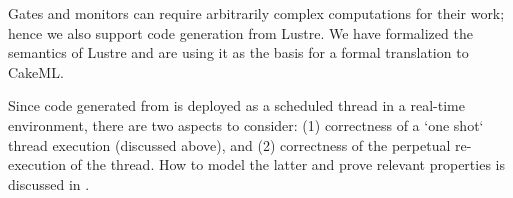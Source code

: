 Gates and monitors can require arbitrarily complex computations for
their work; hence we also support code generation from Lustre. We have
formalized the semantics of Lustre and are using it as the basis for a
formal translation to CakeML.

Since code generated from \splat{} is deployed as a scheduled thread
in a real-time environment, there are two aspects to consider: (1)
correctness of a `one shot` thread execution (discussed above), and
(2) correctness of the perpetual re-execution of the thread. How to
model the latter and prove relevant properties is discussed in
\cite{johannes:repeat}.
